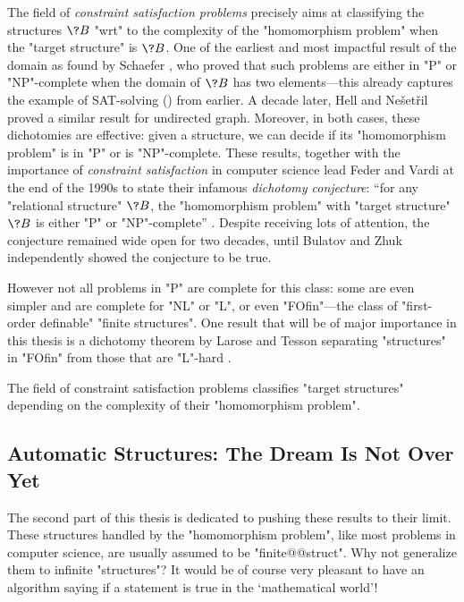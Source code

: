 The field of \emph{constraint satisfaction problems} precisely aims at classifying the
structures $\?B$ "wrt" to the complexity of the "homomorphism problem" when the
"target structure" is $\?B$. One of the earliest and most impactful result
of the domain as found by Schaefer \cite{Schaefer1978ComplexitySatisfiability},
who proved that such problems are either in "P" or "NP"-complete when the domain of $\?B$
has two elements---this already captures the example of SAT-solving () from earlier.
A decade later, Hell and Ne\v{s}et\v{r}il \cite{HellNesetril1990ComplexityColoring}
proved a similar result for undirected graph.
Moreover, in both cases, these dichotomies are effective: given a structure, we can decide if
its "homomorphism problem" is in "P" or is "NP"-complete.
These results, together with the importance of \emph{constraint satisfaction} in computer science
lead Feder and Vardi at the end of the 1990s
to state their infamous \emph{dichotomy conjecture}: ``for any "relational structure" $\?B$,
the "homomorphism problem" with "target structure" $\?B$ is either "P"
or "NP"-complete'' \cite{FederVardi1998ComputationalStructure}.
Despite receiving lots of attention, the conjecture remained wide open for two decades, until
Bulatov \cite{Bulatov2017DichotomyCSPs} and Zhuk \cite{Zhuk2020CSPDichotomy} independently
showed the conjecture to be true.

However not all problems in "P" are complete for this class: some are even simpler and are complete
for "NL" or "L", or even "FOfin"---the class of "first-order definable" "finite structures".
One result that will be of major importance in this thesis is a dichotomy
theorem by Larose and Tesson separating "structures" in "FOfin" from those that are "L"-hard
\cite{LaroseTesson2009UniversalAlgebraCSP}.

\begin{known}
	The field of constraint satisfaction problems classifies "target structures"
	depending on the complexity of their "homomorphism problem".
\end{known}

\subsection{Automatic Structures: The Dream Is Not Over Yet}

The second part of this thesis is dedicated to pushing these results to their limit.
These structures handled by the "homomorphism problem", like most
problems in computer science, are usually assumed to be "finite@@struct".
Why not generalize them to infinite "structures"? It would be of course
very pleasant to have an algorithm saying if a statement is true
in the `mathematical world'!

